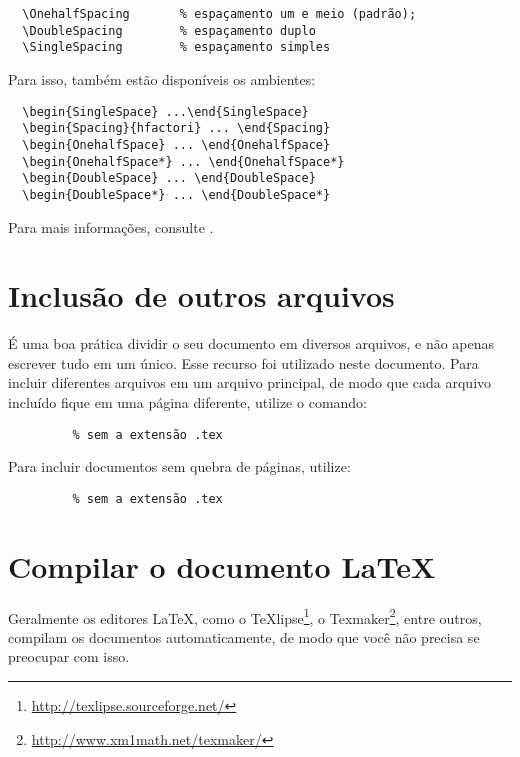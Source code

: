 \begin{verbatim}
  \OnehalfSpacing       % espaçamento um e meio (padrão); 
  \DoubleSpacing        % espaçamento duplo
  \SingleSpacing        % espaçamento simples	
\end{verbatim}

Para isso, também estão disponíveis os ambientes:

\begin{verbatim}
  \begin{SingleSpace} ...\end{SingleSpace}
  \begin{Spacing}{hfactori} ... \end{Spacing}
  \begin{OnehalfSpace} ... \end{OnehalfSpace}
  \begin{OnehalfSpace*} ... \end{OnehalfSpace*}
  \begin{DoubleSpace} ... \end{DoubleSpace}
  \begin{DoubleSpace*} ... \end{DoubleSpace*} 
\end{verbatim}

Para mais informações, consulte .

\section{Inclusão de outros arquivos}\label{sec-include}
É uma boa prática dividir o seu documento em diversos arquivos, e não apenas escrever tudo em um único. Esse recurso foi utilizado neste documento. Para incluir diferentes arquivos em um arquivo principal, de modo que cada arquivo incluído fique em uma página diferente, utilize o comando:

\begin{verbatim}
         % sem a extensão .tex
\end{verbatim}

Para incluir documentos sem quebra de páginas, utilize:

\begin{verbatim}
         % sem a extensão .tex
\end{verbatim}

\section{Compilar o documento \LaTeX}
Geralmente os editores \LaTeX, como o TeXlipse\footnote{\url{http://texlipse.sourceforge.net/}}, o Texmaker\footnote{\url{http://www.xm1math.net/texmaker/}}, entre outros, compilam os documentos automaticamente, de modo que você não precisa se preocupar com isso.

